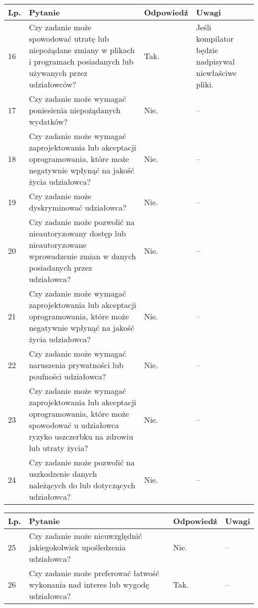 \documentclass[11pt,oneside,a4paper,titlepage,onecolumn]{article}
\begin{document}
\begin{tabularx}{\textwidth}{|l|X|l|X|}
    \hline
    Lp. & Pytanie & Odpowiedź & Uwagi \\ \hline
    
	16
	& Czy zadanie może spowodować utratę lub niepożądane zmiany w plikach i
    programach posiadanych lub używanych przez udziałowców?
	& Tak.
	& Jeśli kompilator będzie nadpisywał niewłaściwe pliki.
	\\\hline
	
	17
	& Czy zadanie może wymagać poniesienia niepożądanych wydatków?
	& Nie.
	& --
	\\\hline
	
	18
	& Czy zadanie może wymagać zaprojektowania lub akceptacji oprogramowania,
    które może negatywnie wpłynąć na jakość życia udziałowca?
	& Nie.
	& --
	\\\hline
	
	19
	& Czy zadanie może dyskryminować udziałowca?
	& Nie.
	& --
	\\\hline
	
	20
	& Czy zadanie może pozwolić na nieautoryzowany dostęp lub nieautoryzowane
    wprowadzenie zmian w danych posiadanych przez udziałowca?
	& Nie.
	& --
	\\\hline
	
	21
	& Czy zadanie może wymagać zaprojektowania lub akceptacji oprogramowania,
    które może negatywnie wpłynąć na jakość życia udziałowca?
	& Nie.
	& --
	\\\hline
	
	22
	& Czy zadanie może wymagać naruszenia prywatności lub poufności udziałowca?
	& Nie.
	& --
	\\\hline
	
	23
	& Czy zadanie może wymagać zaprojektowania lub akceptacji oprogramowania,
    które może spowodować u udziałowca ryzyko uszczerbku na zdrowiu lub utraty
    życia?
	& Nie.
	& --
	\\\hline
	
	24
	& Czy zadanie może pozwolić na uszkodzenie danych należących do lub
    dotyczących udziałowca?
	& Nie.
	& --
	\\\hline
\end{tabularx}

\begin{tabularx}{\textwidth}{|l|X|l|X|}
    \hline
    Lp. & Pytanie & Odpowiedź & Uwagi \\ \hline
    
	25
	& Czy zadanie może nieuwzględnić jakiegokolwiek upośledzenia udziałowca?
	& Nie.
	& --
	\\\hline
    
	26
	& Czy zadanie może preferować łatwość wykonania nad interes lub wygodę
    udziałowca?
	& Tak.
	& --
	\\\hline
\end{tabularx}
\end{document}
